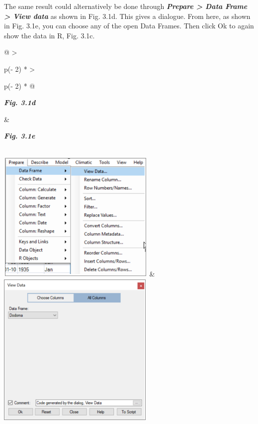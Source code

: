 \documentclass[
  letterpaper,
  DIV=11,
  numbers=noendperiod]{scrreprt}
\begin{document}
The same result could alternatively be done through
\textbf{\emph{Prepare \textgreater{} Data Frame \textgreater{} View
data}} as shown in Fig. 3.1d. This gives a dialogue. From here, as shown
in Fig. 3.1e, you can choose any of the open Data Frames. Then click Ok
to again show the data in R, Fig. 3.1c.

\begin{longtable}[]{@{}
  >{\raggedright\arraybackslash}p{(\columnwidth - 2\tabcolsep) * }
  >{\raggedright\arraybackslash}p{(\columnwidth - 2\tabcolsep) * }@{}}
\toprule\noalign{}
\begin{minipage}[b]{\linewidth}\raggedright
\textbf{\emph{Fig. 3.1d}}
\end{minipage} & \begin{minipage}[b]{\linewidth}\raggedright
\textbf{\emph{Fig. 3.1e}}
\end{minipage} \\
\midrule\noalign{}
\endhead
\bottomrule\noalign{}
\endlastfoot
\includegraphics[width=2.99875in,height=2.47723in]{figures/Fig3.1d.png}
&
\includegraphics[width=2.97072in,height=2.98024in]{figures/Fig3.1e.png} \\
\end{longtable}
\end{document}
